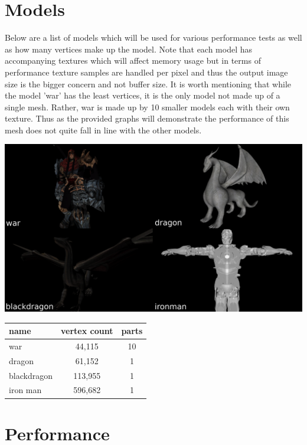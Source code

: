 \documentclass[12pt]{article}
\begin{document}
\section*{Models}

Below are a list of models which will be used for various performance tests as well as how many
vertices make up the model. Note that each model has accompanying textures which will affect memory
usage but in terms of performance texture samples are handled per pixel and thus the output image
size is the bigger concern and not buffer size.
It is worth mentioning that while the model 'war' has the least vertices, it is the only model
not made up of a single mesh. Rather, war is made up by 10 smaller models each with their own texture.
Thus as the provided graphs will demonstrate the performance of this mesh does not quite fall in line
with the other models.

\begin{center}
	\includegraphics[scale=0.225]{models.png}
\end{center}

\bigbreak
\begin{center}
	\begin{tabular}{|l|c|c|}
		\hline
		name & vertex count & parts \\ \hline \hline
		war & 44,115 & 10 \\ \hline
		dragon & 61,152 & 1 \\ \hline
		blackdragon & 113,955 & 1 \\ \hline
		iron man & 596,682 & 1 \\ \hline
	\end{tabular}
\end{center}

\section*{Performance}
\end{document}
